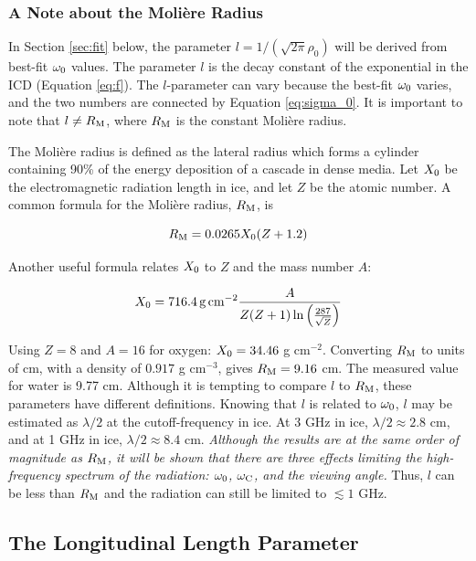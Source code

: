 \documentclass[amsmath,amssymb,aps,prd,10pt,twocolumn]{revtex4}
\begin{document}
\subsubsection{A Note about the Moli\`{e}re Radius}

In Section \ref{sec:fit} below, the parameter $l = 1/(\sqrt{2\pi}\rho_0)$ will be derived from best-fit $\omega_{\rm 0}$ values.  The parameter $l$ is the decay constant of the exponential in the ICD (Equation \ref{eq:f}).  The $l$-parameter can vary because the best-fit $\omega_{\rm 0}$ varies, and the two numbers are connected by Equation \ref{eq:sigma_0}.  It is important to note that $l \neq R_{\rm M}$, where $R_{\rm M}$ is the constant Moli\`{e}re radius.

The Moli\`{e}re radius is defined as the lateral radius which forms a cylinder containing 90\% of the energy deposition of a cascade in dense media.  Let $X_{\rm 0}$ be the electromagnetic radiation length in ice, and let $Z$ be the atomic number.  A common formula for the Moli\`{e}re radius, $R_{\rm M}$, is

\begin{equation}
R_{\rm M} = 0.0265 X_{\rm 0} (Z + 1.2)
\end{equation}

Another useful formula relates $X_{\rm 0}$ to $Z$ and the mass number $A$:

\begin{equation}
X_{\rm 0} = \SI{716.4}{\g\per\cm\squared} \frac{A}{Z(Z+1) \ln\left(\frac{287}{\sqrt{Z}}\right)}
\end{equation}

Using $Z = 8$ and $A = 16$ for oxygen: $X_{\rm 0} = 34.46$ g cm$^{-2}$. Converting $R_{\rm M}$ to units of cm, with a density of $0.917$ g cm$^{-3}$, gives $R_{\rm M} = 9.16$ cm.  The measured value for water is 9.77 cm.  Although it is tempting to compare $l$ to $R_{\rm M}$, these parameters have different definitions. Knowing that $l$ is related to $\omega_{\rm 0}$, $l$ may be estimated as $\lambda/2$ at the cutoff-frequency in ice.  At 3 GHz in ice, $\lambda/2 \approx 2.8$ cm, and at 1 GHz in ice, $\lambda/2 \approx 8.4$ cm.  \textit{Although the results are at the same order of magnitude as $R_{\rm M}$, it will be shown that there are three effects limiting the high-frequency spectrum of the radiation: $\omega_{\rm 0}$, $\omega_{\rm C}$, and the viewing angle.}  Thus, $l$ can be less than $R_{\rm M}$ and the radiation can still be limited to $\lesssim 1$ GHz.  

\subsection{The Longitudinal Length Parameter}
\label{sec:ff2}
\end{document}
